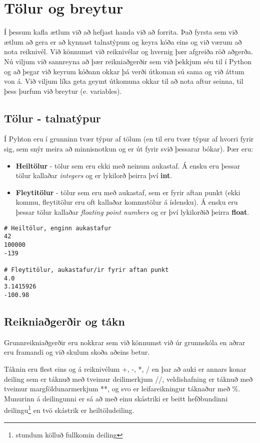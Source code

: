 
\chapter{Tölur og breytur}\label{k:tolur}
Í þessum kafla ætlum við að hefjast handa við að forrita. 
Það fyrsta sem við ætlum að gera er að kynnast talnatýpum og keyra kóða eins og við værum að nota reiknivél. 
Við könnumst við reiknivélar og hvernig þær afgreiða röð aðgerða. 
Nú viljum við sannreyna að þær reikniaðgerðir sem við þekkjum séu til í Python og að þegar við keyrum kóðann okkar þá verði útkoman sú sama og við áttum von á. 
Við viljum líka geta geymt útkomuna okkar til að nota aftur seinna, til þess þurfum við breytur (e. variables).

\section{Tölur - talnatýpur}
Í Pyhton eru í grunninn tvær týpur af tölum (en til eru tvær týpur af hvorri fyrir sig, sem snýr meira að minnisnotkun og er út fyrir svið þessarar bókar). 
Þær eru:

\begin{itemize}
	\item \textbf{Heiltölur} - tölur sem eru ekki með neinum aukastaf. 
	Á ensku eru þessar tölur kallaðar \textit{integers} og er lykilorð þeirra því \textbf{int}.
	\item \textbf{Fleytitölur} - tölur sem eru með aukastaf, sem er fyrir aftan punkt (ekki kommu, fleytitölur eru oft kallaðar kommutölur á íslensku). 
	Á ensku eru þessar tölur kallaðar \textit{floating point numbers} og er því lykilorðið þeirra \textbf{float}.
\end{itemize}

\begin{lstlisting}[caption=Heiltölur og fleytitölur]
# Heiltölur, enginn aukastafur
42
100000
-139

# Fleytitölur, aukastafur/ir fyrir aftan punkt
4.0
3.1415926
-100.98
\end{lstlisting}

\section{Reikniaðgerðir og tákn}
Grunnreikniaðgerðir eru nokkrar sem við könnumst við úr grunnskóla en aðrar eru framandi og við skulum skoða aðeins betur.

Táknin eru flest eins og á reiknivélum +, -, *, / en þar að auki er annars konar deiling sem er táknuð með tveimur deilimerkjum //, veldishafning er táknuð með tveimur margföldunarmerkjum **, og svo er leifareikningur táknaður með \%.
Munurinn á deilingunni er sá að með einu skástriki er beitt hefðbundinni deilingu\footnote{stundum kölluð fullkomin deiling} en tvö skástrik er heiltöludeiling.

